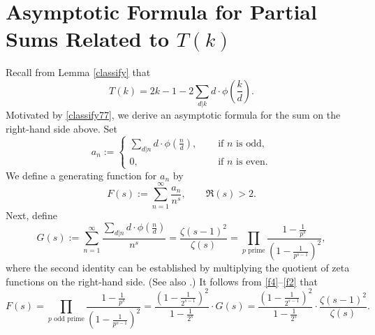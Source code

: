 \documentclass[11pt,reqno]{amsart}
\theoremstyle{plain}
\numberwithin{equation}{section}
\begin{document}
\section{Asymptotic Formula for Partial Sums Related to $T(k)$}\label{asymptotic,1}
Recall from Lemma \ref{classify} that
\begin{equation}
T(k)= 2k - 1 - 2\sum\limits_{d|k} d\cdot\phi\left(\frac{k}{d}\right).\label{classify77}
\end{equation}
Motivated by \eqref{classify77}, we derive an asymptotic formula for the sum on the right-hand side above.
Set
\begin{equation}\label{f4}
a_n := \begin{cases}
\displaystyle{\sum_{d|n}d\cdot\phi\left(\frac{n}{d}\right)}, \quad &\text{ if }  n  \text{ is odd},\\
0, &\text{ if } n \text{ is even}.
\end{cases}
\end{equation}
We define a generating function for $a_n$ by
\begin{equation}\label{f1}
F(s) := \sum_{n=1}^{\infty} \frac{a_n}{n^s}, \qquad \Re( s )>2.
\end{equation}
Next, define
\begin{equation}\label{f2}
G(s) := \sum_{n = 1}^{\infty}\frac{\sum_{d|n}d\cdot \phi\left(\frac{n}{d}\right)}{n^s} = \frac{\zeta(s-1)^2}{\zeta(s)} = \prod_{p \text{ prime}}\frac{1-\frac{1}{p^s}}{\left(1-\frac{1}{p^{s-1}}\right)^2},
\end{equation}
where the second identity can be established by multiplying the quotient of zeta functions on the right-hand side.  (See also \cite[p.~6, Equation (1.2.12)]{zeta}.)
It follows from \eqref{f4}--\eqref{f2} that
\begin{equation}\label{f3}
F(s) =  \prod_{p \text{ odd prime}}\frac{1-\frac{1}{p^s}}{\left(1-\frac{1}{p^{s-1}}\right)^2} = \frac{\left(1-\frac{1}{2^{s-1}}\right)^2}{1-\frac{1}{2^s}}\cdot G(s) = \frac{\left(1-\frac{1}{2^{s-1}}\right)^2}{1-\frac{1}{2^s}}\cdot \frac{\zeta(s-1)^2}{\zeta(s)}.
\end{equation}
\end{document}
